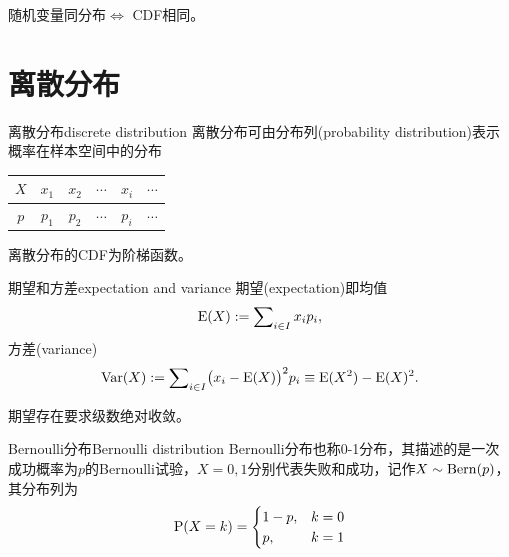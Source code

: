 \begin{corollary}
	随机变量同分布$\iff$ CDF相同。
\end{corollary}

\section{离散分布}

\begin{definition}{离散分布}{discrete distribution}
	离散分布可由分布列(probability distribution)表示概率在样本空间中的分布
	\begin{center}
		\begin{tabular}{cccccc}
			\toprule
			$X$&$x_1$&$x_2$&$\cdots$&$x_i$&$\cdots$\\
			\midrule
			$p$&$p_1$&$p_2$&$\cdots$&$p_i$&$\cdots$\\
			\bottomrule
		\end{tabular}
	\end{center}
\end{definition}

\begin{corollary}
	离散分布的CDF为阶梯函数。

\end{corollary}

\begin{definition}{期望和方差}{expectation and variance}
	期望(expectation)即均值
	\begin{equation}
		\E(X) := \sum\nolimits_{i\in I}x_ip_i,
	\end{equation}
	方差(variance)
	\begin{equation}
		\Var(X) := \sum\nolimits_{i\in I}\bigp{x_i - \E(X)}^2p_i \equiv \E(X^2) - \E(X)^2.
	\end{equation}
\end{definition}

\begin{remark}
	期望存在要求级数绝对收敛。
\end{remark}

\begin{definition}{Bernoulli分布}{Bernoulli distribution}
	Bernoulli分布也称0-1分布，其描述的是一次成功概率为$p$的Bernoulli试验，$X = 0,1$分别代表失败和成功，记作$X \sim \BernDist(p)$，其分布列为
	\begin{equation}
		\P(X = k) = \begin{cases}
			1 - p,&k = 0\\
			p,&k = 1
		\end{cases}
	\end{equation}
\end{definition}

